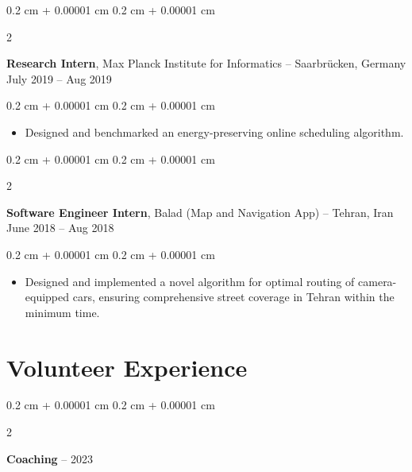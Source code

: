 \documentclass[10pt, letterpaper]{article}
\newenvironment{highlights}{
    \begin{itemize}[
        topsep=0.1 cm,
        parsep=0.10 cm,
        partopsep=0pt,
        itemsep=0pt,
        leftmargin=0.4 cm + 10pt
    ]
}{
    \end{itemize}
} %
\newenvironment{onecolentry}{
    \begin{adjustwidth}{
        0.2 cm + 0.00001 cm
    }{
        0.2 cm + 0.00001 cm
    }
}{
    \end{adjustwidth}
} %
\newenvironment{twocolentry}[2][]{
    \onecolentry
    \def\secondColumn{#2}
    \setcolumnwidth{\fill, 4.5 cm}
    \begin{paracol}{2}
}{
    \switchcolumn \raggedleft \secondColumn
    \end{paracol}
    \endonecolentry
} %
\begin{document}
        \vspace{0.2 cm}

        \begin{twocolentry}{
            July 2019 – Aug 2019
        }
            \textbf{Research Intern}, Max Planck Institute for Informatics -- Saarbrücken, Germany\end{twocolentry}

        \vspace{0.1 cm}
        \begin{onecolentry}
            \begin{highlights}
                \item Designed and benchmarked an energy-preserving online scheduling algorithm.
            \end{highlights}
        \end{onecolentry}


        \vspace{0.2 cm}

        \begin{twocolentry}{
            June 2018 – Aug 2018
        }
            \textbf{Software Engineer Intern}, Balad (Map and Navigation App) -- Tehran, Iran\end{twocolentry}

        \vspace{0.1 cm}
        \begin{onecolentry}
            \begin{highlights}
                \item Designed and implemented a novel algorithm for optimal routing of camera-equipped cars, ensuring comprehensive street coverage in Tehran within the minimum time.
            \end{highlights}
        \end{onecolentry}



    
    \section{Volunteer Experience}



        
        \begin{twocolentry}{
            2020 – 2023
        }
            \textbf{Coaching}\end{twocolentry}
\end{document}
